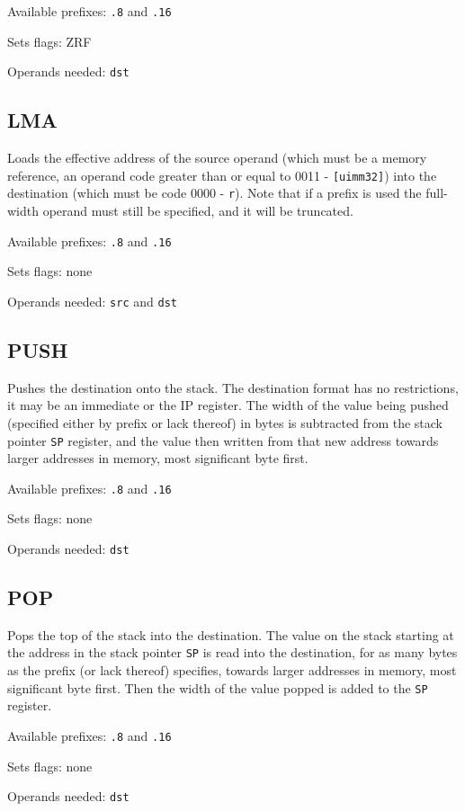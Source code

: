 \documentclass[12pt,a4paper]{report}
\begin{document}
Available prefixes: \texttt{.8} and \texttt{.16}

Sets flags: ZRF

Operands needed: \texttt{dst}

\subsection*{LMA}
Loads the effective address of the source operand (which must be a memory reference, an operand code greater than or equal to 0011 - \texttt{[uimm32]}) into the destination (which must be code 0000 - \texttt{r}). Note that if a prefix is used the full-width operand must still be specified, and it will be truncated.

Available prefixes: \texttt{.8} and \texttt{.16}

Sets flags: none

Operands needed: \texttt{src} and \texttt{dst}

\subsection*{PUSH}
Pushes the destination onto the stack. The destination format has no restrictions, it may be an immediate or the IP register. The width of the value being pushed (specified either by prefix or lack thereof) in bytes is subtracted from the stack pointer \texttt{SP} register, and the value then written from that new address towards larger addresses in memory, most significant byte first.

Available prefixes: \texttt{.8} and \texttt{.16}

Sets flags: none

Operands needed: \texttt{dst}

\subsection*{POP}
Pops the top of the stack into the destination. The value on the stack starting at the address in the stack pointer \texttt{SP} is read into the destination, for as many bytes as the prefix (or lack thereof) specifies, towards larger addresses in memory, most significant byte first. Then the width of the value popped is added to the \texttt{SP} register.

Available prefixes: \texttt{.8} and \texttt{.16}

Sets flags: none

Operands needed: \texttt{dst}
\end{document}
